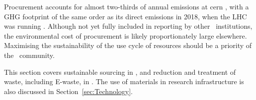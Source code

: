 \documentclass[../SustainableHEP.tex]{subfiles}
\begin{document}
Procurement accounts for almost two-thirds of annual emissions at \acrshort{cern} \cite{CERNTownHall}, with a GHG footprint of the same order as its direct emissions in 2018, when the LHC was running \cite{Environment:2737239}. Although not yet fully included in reporting by other \ACR\ institutions, the environmental cost of procurement is likely proportionately large elsewhere.  Maximising the sustainability of the use cycle of resources should be a priority of the \ACR\ community. 

This section covers sustainable sourcing in , and reduction and treatment of waste, including E-waste, in . The use of materials in research infrastructure is also discussed in Section~\ref{sec:Technology}.

\end{document}
